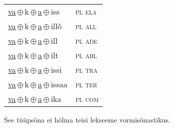 \begin{minipage}{\textwidth}
\begin{sideways}
\begin{tabular}{l l}
\underline{va}\,$\oplus$\,k\,$\oplus$\,\underline{a}\,$\oplus$\,iss & \textsc{ pl ela } \\
\underline{va}\,$\oplus$\,k\,$\oplus$\,\underline{a}\,$\oplus$\,illõ & \textsc{ pl all } \\
\underline{va}\,$\oplus$\,k\,$\oplus$\,\underline{a}\,$\oplus$\,ill & \textsc{ pl ade } \\
\underline{va}\,$\oplus$\,k\,$\oplus$\,\underline{a}\,$\oplus$\,ilt & \textsc{ pl abl } \\
\underline{va}\,$\oplus$\,k\,$\oplus$\,\underline{a}\,$\oplus$\,issi & \textsc{ pl tra } \\
\underline{va}\,$\oplus$\,k\,$\oplus$\,\underline{a}\,$\oplus$\,issaa & \textsc{ pl ter } \\
\underline{va}\,$\oplus$\,k\,$\oplus$\,\underline{a}\,$\oplus$\,ika & \textsc{ pl com } \\
\end{tabular}
\end{sideways}
\label{tab:tüüpsõnamall-vaka}

\end{minipage}

 
\vspace{1em}
\noindent See tüüpsõna ei hõlma teisi lekseeme vormi\-sõnastikus.
